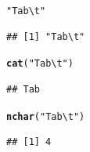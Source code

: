 \documentclass[onecolumn,12pt]{book}\usepackage[]{graphicx}\usepackage[]{color}
\makeatletter
\newcommand{\hlstr}[1]{\textcolor[rgb]{0.192,0.494,0.8}{#1}}%
\newcommand{\hlstd}[1]{\textcolor[rgb]{0.345,0.345,0.345}{#1}}%
\newcommand{\hlkwd}[1]{\textcolor[rgb]{0.737,0.353,0.396}{\textbf{#1}}}%
\newenvironment{kframe}{%
 \def\at@end@of@kframe{}%
 \ifinner\ifhmode%
  \def\at@end@of@kframe{\end{minipage}}%
  \begin{minipage}{\columnwidth}%
 \fi\fi%
 \def\FrameCommand##1{\hskip\@totalleftmargin \hskip-\fboxsep
 \colorbox{shadecolor}{##1}\hskip-\fboxsep
     \hskip-\linewidth \hskip-\@totalleftmargin \hskip\columnwidth}%
 \MakeFramed {\advance\hsize-\width
   \@totalleftmargin\z@ \linewidth\hsize
   \@setminipage}}%
 {\par\unskip\endMakeFramed%
 \at@end@of@kframe}
\newenvironment{knitrout}{}{} %
\makeatother
\begin{document}
\begin{knitrout}
\color{fgcolor}\begin{kframe}
\begin{alltt}
\hlstr{"Tab\textbackslash{}t"}
\end{alltt}
\begin{verbatim}
## [1] "Tab\t"
\end{verbatim}
\begin{alltt}
\hlkwd{cat}\hlstd{(}\hlstr{"Tab\textbackslash{}t"}\hlstd{)}
\end{alltt}
\begin{verbatim}
## Tab	
\end{verbatim}
\begin{alltt}
\hlkwd{nchar}\hlstd{(}\hlstr{"Tab\textbackslash{}t"}\hlstd{)}
\end{alltt}
\begin{verbatim}
## [1] 4
\end{verbatim}
\end{kframe}
\end{knitrout}
\end{document}
